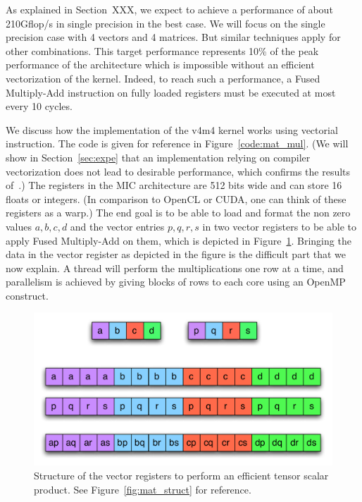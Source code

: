 \documentclass[10pt,conference,compsocconf]{IEEEtran}
\begin{document}
As explained in Section~XXX, we expect to achieve a performance of
about 210Gflop/s in single precision in the best case. We will focus
on the single precision case with 4 vectors and 4 matrices. But
similar techniques apply for other combinations. This target
performance represents 10\% of the peak performance of the
architecture which is impossible without an efficient vectorization of
the kernel. Indeed, to reach such a performance, a Fused Multiply-Add
instruction on fully loaded registers must be executed at most every
10 cycles.

We discuss how the implementation of the v4m4 kernel works using
vectorial instruction. The code is given for reference in
Figure~\ref{code:mat_mul}. (We will show in Section~\ref{sec:expe} that an implementation
relying on compiler vectorization does not lead to desirable
performance, which confirms the results of~\cite{Saule13-ARXIV}.) The registers in the MIC architecture are 512 bits wide
and can store 16 floats or integers. (In comparison to OpenCL or CUDA,
one can think of these registers as a warp.) The end goal is to be
able to load and format the non zero values $a,b,c,d$ and the vector
entries $p,q,r,s$ in two vector registers to be able to apply Fused
Multiply-Add on them, which is depicted in
Figure~\ref{fig:tensor_product}. Bringing the data in the vector
register as depicted in the figure is the difficult part that we now
explain. A thread will perform the multiplications one row at a time,
and parallelism is achieved by giving blocks of rows to each core
using an OpenMP construct.

\begin{figure}
  \centering
  \includegraphics[width=\linewidth]{figures/tensor_product.pdf}
  \caption{Structure of the vector registers to perform an efficient
    tensor scalar product. See Figure~\ref{fig:mat_struct} for
    reference.}
  \label{fig:tensor_product}
\end{figure}
\end{document}
